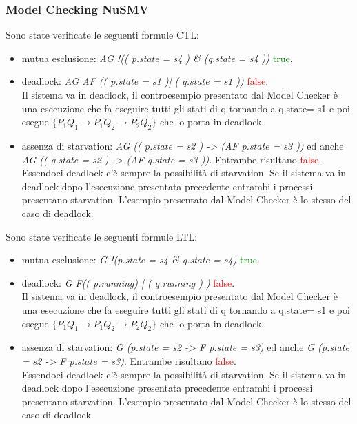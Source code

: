 \documentclass[a4paper]{article}
\begin{document}
\subsubsection{Model Checking NuSMV}
Sono state verificate le seguenti formule CTL:
\begin{itemize}
        \item mutua esclusione: \textit{AG !(( p.state = s4 ) \& (q.state = s4 ))} \textcolor{green}{true}.
        \item deadlock: \textit{AG AF (( p.state = s1 )| ( q.state = s1 ))} \textcolor{red}{false}.\\
		Il sistema va in deadlock, il controesempio presentato dal Model Checker è una esecuzione che fa eseguire tutti gli stati di q tornando a q.state= s1 e poi esegue $\{P_1Q_1 \rightarrow P_1Q_2 \rightarrow P_2Q_2\}$ che lo porta in deadlock.
        \item assenza di starvation: \textit{AG (( p.state = s2 ) -> (AF p.state = s3 ))} ed anche \textit{AG (( q.state = s2 ) -> (AF q.state = s3 ))}. Entrambe risultano \textcolor{red}{false}.\\
		Essendoci deadlock c'è sempre la possibilità di starvation. Se il sistema va in deadlock dopo l'esecuzione presentata precedente entrambi i processi presentano starvation.
		L'esempio presentato dal Model Checker è lo stesso del caso di deadlock.
\end{itemize}
Sono state verificate le seguenti formule LTL:
\begin{itemize}
        \item mutua esclusione: \textit{G !(p.state = s4 \& q.state = s4)} \textcolor{green}{true}.\\
        \item deadlock: \textit{G F(( p.running) | ( q.running ) )} \textcolor{red}{false}. \\
		Il sistema va in deadlock, il controesempio presentato dal Model Checker è una esecuzione che fa eseguire tutti gli stati di q tornando a q.state= s1 e poi esegue $\{P_1Q_1 \rightarrow P_1Q_2 \rightarrow P_2Q_2\}$ che lo porta in deadlock.
        \item assenza di starvation: \textit{G (p.state = s2 ->  F p.state = s3)} ed anche \textit{G (p.state = s2 ->  F p.state = s3)}. Entrambe risultano \textcolor{red}{false}.\\
		Essendoci deadlock c'è sempre la possibilità di starvation. Se il sistema va in deadlock dopo l'esecuzione presentata precedente entrambi i processi presentano starvation.
		L'esempio presentato dal Model Checker è lo stesso del caso di deadlock.
\end{itemize}
\end{document}
